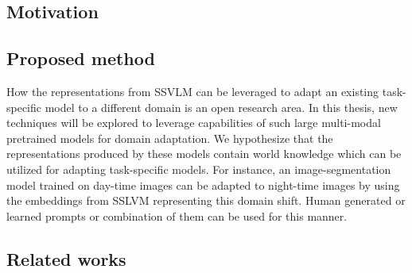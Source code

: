 \documentclass[conference]{IEEEtran}
\begin{document}
\subsection{Motivation}

\subsection{Proposed method}
How the representations from SSVLM can be leveraged to adapt an existing task-specific model to a different domain is an open research area. In this thesis, new techniques will be explored to leverage capabilities of such large multi-modal pretrained models for domain adaptation. We hypothesize that the representations produced by these models contain world knowledge which can be utilized for adapting task-specific models. For instance, an image-segmentation model trained on day-time images can be adapted to night-time images by using the embeddings from SSLVM representing this domain shift. Human generated or learned prompts or combination of them can be used for this manner.


\subsection{Related works}

\clearpage


\end{document}
